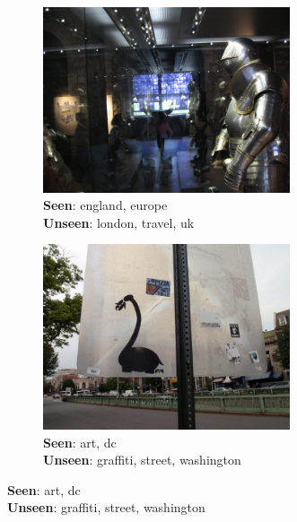 \begin{figure}
	\; \vline
        \; %
        \begin{subfigure}[b]{0.17\textwidth}
                \includegraphics[width=0.8\textwidth]{TagTree/Flickrimg/7c52f0a2-78ae-3b9b-9dd0-f131124750f5.jpeg}
                \caption{\textbf{Seen}: england, europe \\ \textbf{Unseen}: london, travel, uk }
                \label{fig:posex3}
        \end{subfigure}%
	\; \vline
        \; %
        \begin{subfigure}[b]{0.16\textwidth}
                \includegraphics[width=0.8\textwidth]{TagTree/Flickrimg/b03623e7-e6cf-3e96-97cc-a7117c776614.jpeg}
                \caption{\textbf{Seen}: art, dc \\ \textbf{Unseen}: graffiti, street, washington }

\end{subfigure}
\end{figure}

